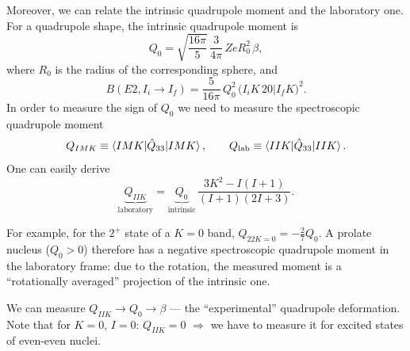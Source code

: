 \documentclass[11pt,a4paper]{article}
\newcommand{\op}[1]{\hat{#1}}
\begin{document}
Moreover, we can relate the intrinsic quadrupole moment and the laboratory one. For a quadrupole shape, the intrinsic quadrupole moment is
\[
Q_0=\sqrt{\frac{16\pi}{5}}\,\frac{3}{4\pi}\,ZeR_0^2\,\beta,
\]
where $R_0$ is the radius of the corresponding sphere, and
\[
B(E2,I_i\to I_f)=\frac{5}{16\pi}\,Q_0^2\,\big(I_iK\,20\big|I_fK\big)^2 .
\]
In order to measure the sign of $Q_0$ we need to measure the spectroscopic quadrupole moment
\[
Q_{IMK}\equiv\braket{IMK|\op Q_{33}|IMK},\qquad Q_{\rm lab}\equiv\braket{IIK|\op Q_{33}|IIK}.
\]
One can easily derive
\[
\underbrace{Q_{IIK}}_{\text{laboratory}}=\underbrace{Q_0}_{\text{intrinsic}}\,\frac{3K^2-I(I+1)}{(I+1)(2I+3)} .
\]

For example, for the $2^+$ state of a $K=0$ band, $Q_{22K=0}=-\frac27Q_0$. A prolate nucleus ($Q_0>0$) therefore has a negative spectroscopic quadrupole moment in the laboratory frame: due to the rotation, the measured moment is a ``rotationally averaged'' projection of the intrinsic one.

We can measure $Q_{IIK}\to Q_0\to\beta$ --- the ``experimental'' quadrupole deformation.
Note that for $K=0$, $I=0$: $Q_{IIK}=0$ $\Rightarrow$ we have to measure it for excited states of even-even nuclei.

\end{document}
